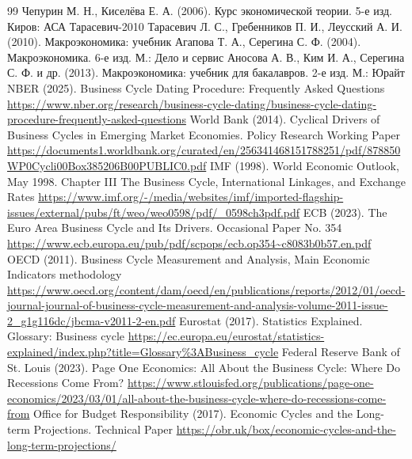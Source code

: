 \begin{RaggedRight}
\begin{thebibliography}{99}
     \hypertarget{bib:Чепурин-2006}{} Чепурин М. Н., Киселёва Е. А. (2006). Курс экономической теории. 5-е изд. Киров: АСА
     \hypertarget{bib:}{Тарасевич-2010} Тарасевич Л. С., Гребенников П. И., Леусский А. И. (2010). Макроэкономика: учебник
     \hypertarget{bib:Агапова-2004}{} Агапова Т. А., Серегина С. Ф. (2004). Макроэкономика. 6-е изд. М.: Дело и сервис
     \hypertarget{bib:Аносова-2013}{} Аносова А. В., Ким И. А., Серегина С. Ф. и др. (2013). Макроэкономика: учебник для бакалавров. 2-е изд. М.: Юрайт
     \hypertarget{bib:NBER-2025}{} NBER (2025). Business Cycle Dating Procedure: Frequently Asked Questions \url{https://www.nber.org/research/business-cycle-dating/business-cycle-dating-procedure-frequently-asked-questions}
     \hypertarget{bib:WB-2014}{} World Bank (2014). Cyclical Drivers of Business Cycles in Emerging Market Economies. Policy Research Working Paper \url{https://documents1.worldbank.org/curated/en/256341468151788251/pdf/878850WP0Cycli00Box385206B00PUBLIC0.pdf}
     \hypertarget{bib:IMF-1998}{} IMF (1998). World Economic Outlook, May 1998. Chapter III \textquotedbl{}The Business Cycle, International Linkages, and Exchange Rates\textquotedbl{} \url{https://www.imf.org/-/media/websites/imf/imported-flagship-issues/external/pubs/ft/weo/weo0598/pdf/_0598ch3pdf.pdf}
     \hypertarget{bib:ECB-2023}{} ECB (2023). The Euro Area Business Cycle and Its Drivers. Occasional Paper No. 354 \url{https://www.ecb.europa.eu/pub/pdf/scpops/ecb.op354~c8083b0b57.en.pdf}
     \hypertarget{bib:OECD-2011}{} OECD (2011). Business Cycle Measurement and Analysis, Main Economic Indicators methodology \url{https://www.oecd.org/content/dam/oecd/en/publications/reports/2012/01/oecd-journal-journal-of-business-cycle-measurement-and-analysis-volume-2011-issue-2_g1g116dc/jbcma-v2011-2-en.pdf}
     \hypertarget{bib:Eurostat-2017}{} Eurostat (2017). Statistics Explained. Glossary: \textquotedbl{}Business cycle\textquotedbl{} \url{https://ec.europa.eu/eurostat/statistics-explained/index.php?title=Glossary%3ABusiness_cycle}
     \hypertarget{bib:FRED-2023}{} Federal Reserve Bank of St. Louis (2023). Page One Economics: All About the Business Cycle: Where Do Recessions Come From? \url{https://www.stlouisfed.org/publications/page-one-economics/2023/03/01/all-about-the-business-cycle-where-do-recessions-come-from}
     \hypertarget{bib:OBR-2017}{} Office for Budget Responsibility (2017). Economic Cycles and the Long-term Projections. Technical Paper \url{https://obr.uk/box/economic-cycles-and-the-long-term-projections/}

\end{thebibliography}
\end{RaggedRight}

